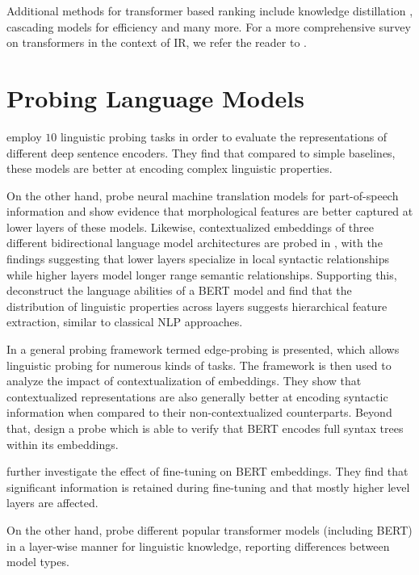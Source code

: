 Additional methods for transformer based ranking include knowledge distillation \cite{DBLP:journals/corr/abs-2009-07531, DBLP:journals/corr/abs-2010-02666}, cascading models for efficiency \cite{Nogueira2019MultiStageDR} and many more. For a more comprehensive survey on transformers in the context of IR, we refer the reader to \cite{10.1145/3437963.3441667}.

\section{Probing Language Models}
\cite{conneau-etal-2018-cram} employ $10$ linguistic probing tasks in order to evaluate the representations of different deep sentence encoders. They find that compared to simple baselines, these models are better at encoding complex linguistic properties.

On the other hand, \cite{Belinkov2017WhatDN} probe neural machine translation models for part-of-speech information and show evidence that morphological features are better captured at lower layers of these models. Likewise, contextualized embeddings of three different bidirectional language model architectures are probed in \cite{peters-etal-2018-dissecting}, with the findings suggesting that lower layers specialize in local syntactic relationships while higher layers model longer range semantic relationships. Supporting this, \cite{tenney-etal-2019-bert} deconstruct the language abilities of a BERT model and find that the distribution of linguistic properties across layers suggests hierarchical feature extraction, similar to classical NLP approaches.

In \cite{Tenney2019WhatDY} a general probing framework termed edge-probing is presented, which allows linguistic probing for numerous kinds of tasks. The framework is then used to analyze the impact of contextualization of embeddings. They show that contextualized representations are also generally better at encoding syntactic information when compared to their non-contextualized counterparts. Beyond that, \cite{Hewitt2019ASP} design a probe which is able to verify that BERT encodes full syntax trees within its embeddings.

\cite{merchant-etal-2020-happens} further investigate the effect of fine-tuning on BERT embeddings. They find that significant information is retained during fine-tuning and that mostly higher level layers are affected.

On the other hand, \cite{Fayyaz2021NotAM} probe different popular transformer models (including BERT) in a layer-wise manner for linguistic knowledge, reporting differences between model types.


